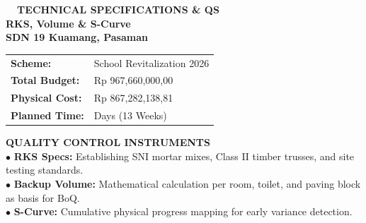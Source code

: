 \documentclass[10pt,a4paper,landscape]{article}
\begin{document}
\noindent
\begin{minipage}[t]{0.30\linewidth}
  \vspace{0pt}
  \begin{tcolorbox}[sharp corners, boxrule=0.8pt, colframe=pborder, colback=white, left=3mm, right=3mm, top=2.5mm, bottom=2.5mm, height=98mm]
    \colorbox{pred}{\fontsize{7pt}{8pt}\selectfont\bfseries\color{white}\ \ TECHNICAL SPECIFICATIONS \& QS\ \ }\\[1.5mm]
    {\fontsize{9.5pt}{11.5pt}\selectfont\bfseries\color{pnavy}RKS, Volume \& S-Curve}\\[0.5mm]
    {\fontsize{7pt}{8.5pt}\selectfont\bfseries\color{pred}SDN 19 Kuamang, Pasaman}\\[2mm]

    \begin{tcolorbox}[sharp corners, boxrule=0.5pt, colframe=pborder, colback=pbglight, left=2mm, right=2mm, top=1.5mm, bottom=1.5mm]
      \begin{tabularx}{\linewidth}{@{}p{22mm} X@{}}
        {\fontsize{6.8pt}{8pt}\selectfont\bfseries Scheme:} & {\fontsize{6.8pt}{8pt}\selectfont School Revitalization 2026} \\[0.8mm]
        {\fontsize{6.8pt}{8pt}\selectfont\bfseries Total Budget:} & {\fontsize{6.8pt}{8pt}\selectfont Rp 967,660,000,00} \\[0.8mm]
        {\fontsize{6.8pt}{8pt}\selectfont\bfseries Physical Cost:} & {\fontsize{6.8pt}{8pt}\selectfont Rp 867,282,138,81} \\[0.8mm]
        {\fontsize{6.8pt}{8pt}\selectfont\bfseries Planned Time:} & {\fontsize{6.8pt}{8pt}\selectfont 90 Days (13 Weeks)}
      \end{tabularx}
    \end{tcolorbox}
    \vspace{1.5mm}

    {\fontsize{7.5pt}{9pt}\selectfont\bfseries\color{pnavy}QUALITY CONTROL INSTRUMENTS}\\[0.8mm]
    {\fontsize{6.5pt}{8.2pt}\selectfont\color{psteel}
    $\bullet$ \textbf{RKS Specs:} Establishing SNI mortar mixes, Class II timber trusses, and site testing standards.\\
    $\bullet$ \textbf{Backup Volume:} Mathematical calculation per room, toilet, and paving block as basis for BoQ.\\
    $\bullet$ \textbf{S-Curve:} Cumulative physical progress mapping for early variance detection.
    }
  \end{tcolorbox}
  \vspace{2mm}


\end{minipage}
\end{document}
